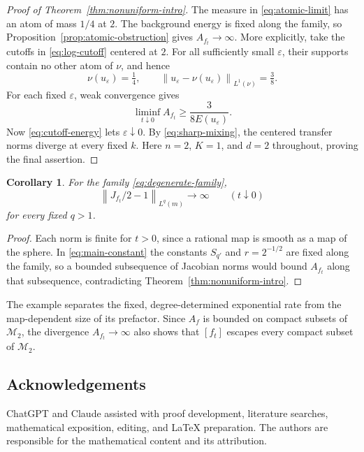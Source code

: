 \documentclass[11pt,reqno]{amsart}
\theoremstyle{plain}
\newtheorem{corollary}[theorem]{Corollary}
\theoremstyle{definition}
\theoremstyle{remark}
\newcommand{\norm}[1]{\left\lVert #1\right\rVert}
\numberwithin{equation}{section}
\begin{document}
\begin{proof}[Proof of Theorem~\ref{thm:nonuniform-intro}]
The measure in \eqref{eq:atomic-limit} has an atom of mass $1/4$ at $2$. The background energy is fixed along the family, so Proposition~\ref{prop:atomic-obstruction} gives $A_{f_t}\to\infty$. More explicitly, take the cutoffs in \eqref{eq:log-cutoff} centered at $2$. For all sufficiently small $\varepsilon$, their supports contain no other atom of $\nu$, and hence
\[
 \nu(u_\varepsilon)=\tfrac14,
 \qquad
 \norm{u_\varepsilon-\nu(u_\varepsilon)}_{L^1(\nu)}=\tfrac38.
\]
For each fixed $\varepsilon$, weak convergence gives
\[
 \liminf_{t\downarrow0}A_{f_t}\ge\frac{3}{8E(u_\varepsilon)}.
\]
Now \eqref{eq:cutoff-energy} lets $\varepsilon\downarrow0$. By \eqref{eq:sharp-mixing}, the centered transfer norms diverge at every fixed $k$. Here $n=2$, $K=1$, and $d=2$ throughout, proving the final assertion.
\end{proof}

\begin{corollary}\label{cor:jacobian-divergence}
For the family \eqref{eq:degenerate-family},
\[
 \norm{J_{f_t}/2-1}_{L^q(m)}\longrightarrow\infty
 \qquad(t\downarrow0)
\]
for every fixed $q>1$.
\end{corollary}

\begin{proof}
Each norm is finite for $t>0$, since a rational map is smooth as a map of the sphere. In \eqref{eq:main-constant} the constants $S_{q'}$ and $r=2^{-1/2}$ are fixed along the family, so a bounded subsequence of Jacobian norms would bound $A_{f_t}$ along that subsequence, contradicting Theorem~\ref{thm:nonuniform-intro}.
\end{proof}

The example separates the fixed, degree-determined exponential rate from the map-dependent size of its prefactor. Since $A_f$ is bounded on compact subsets of $\mathcal M_2$, the divergence $A_{f_t}\to\infty$ also shows that $[f_t]$ escapes every compact subset of $\mathcal M_2$.

\subsection*{Acknowledgements}
ChatGPT and Claude assisted with proof development, literature searches, mathematical exposition, editing, and LaTeX preparation. The authors are responsible for the mathematical content and its attribution.

\end{document}
